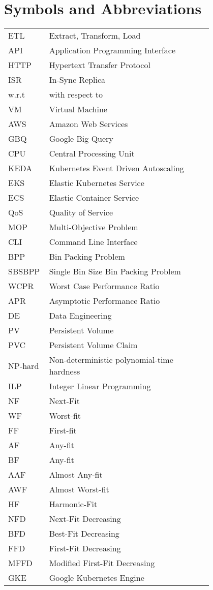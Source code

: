 \chapter*{Symbols and Abbreviations}

\begin{flushleft}
\begin{tabular}{l p{0.8\linewidth}}
ETL      & Extract, Transform, Load\\
API      & Application Programming Interface\\
HTTP     & Hypertext Transfer Protocol \\
ISR      & In-Sync Replica\\
w.r.t    & with respect to\\
VM       & Virtual Machine\\
AWS      & Amazon Web Services\\
GBQ      & Google Big Query\\
CPU      & Central Processing Unit\\
KEDA     & Kubernetes Event Driven Autoscaling\\
EKS      & Elastic Kubernetes Service\\
ECS      & Elastic Container Service\\
QoS      & Quality of Service\\
MOP      & Multi-Objective Problem\\
CLI      & Command Line Interface\\
BPP      & Bin Packing Problem\\
SBSBPP   & Single Bin Size Bin Packing Problem\\
WCPR     & Worst Case Performance Ratio\\
APR      & Asymptotic Performance Ratio\\
DE       & Data Engineering \\
PV       & Persistent Volume \\
PVC      & Persistent Volume Claim \\
NP-hard  & Non-deterministic polynomial-time hardness \\
ILP      & Integer Linear Programming \\
NF       & Next-Fit \\
WF       & Worst-fit \\
FF       & First-fit \\
AF       & Any-fit \\
BF       & Any-fit \\
AAF      & Almost Any-fit \\
AWF      & Almost Worst-fit \\
HF       & Harmonic-Fit \\ 
NFD      & Next-Fit Decreasing \\
BFD      & Best-Fit Decreasing \\
FFD      & First-Fit Decreasing \\
MFFD     & Modified First-Fit Decreasing \\
GKE      & Google Kubernetes Engine \\

\end{tabular}
\end{flushleft}

